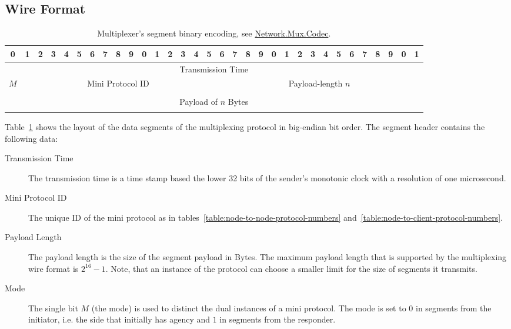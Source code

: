 \subsection{Wire Format}
\label{section:wire-format}

\begin{table}
  \begin{center}
    \begingroup
    \setlength{\tabcolsep}{3pt}
    \begin{tabular}{|c|c|c|c|c|c|c|c|c|c|c|c|c|c|c|c|c|c|c|c|c|c|c|c|c|c|c|c|c|c|c|c|}
      \hline
      0&1&2&3&4&5&6&7&8&9&0&1&2&3&4&5&6&7&8&9&0&1&2&3&4&5&6&7&8&9&0&1 \\ \hline
      \multicolumn{32}{|c|}{Transmission Time} \\ \hline
      \multicolumn{1}{|c|}{$M$}
      &\multicolumn{15}{|c|}{Mini Protocol ID}
      &\multicolumn{16}{|c|}{Payload-length $n$} \\ \hline
      \multicolumn{32}{|c|}{} \\
      \multicolumn{32}{|c|}{Payload of $n$ Bytes} \\
      \multicolumn{32}{|c|}{} \\ \hline
    \end{tabular}
    \endgroup
    \caption{Multiplexer's segment binary encoding, see
    \href{https://input-output-hk.github.io/ouroboros-network/network-mux/Network-Mux-Codec}{Network.Mux.Codec}.}
    \label{segment-header}
  \end{center}
\end{table}

Table~\ref{segment-header} shows the layout of the data segments of the multiplexing protocol
in big-endian bit order.  The segment header contains the following data:
\begin{description}
\item[Transmission Time]
  The transmission time is a time stamp based the lower 32 bits of the sender's monotonic clock with a
  resolution of one microsecond.
\item[Mini Protocol ID] The unique ID of the mini protocol as in
  tables~\ref{table:node-to-node-protocol-numbers}
    and~\ref{table:node-to-client-protocol-numbers}.
\item[Payload Length] The payload length is the size of the segment payload in Bytes.
  The maximum payload length that is supported by the multiplexing wire format is $2^{16}-1$.
  Note, that an instance of the protocol can choose a smaller limit for the size of segments it transmits.
\item[Mode] The single bit $M$ (the mode) is used to distinct the dual instances of a mini protocol.
  The mode is set to $0$ in segments from the initiator, i.e. the side that initially has agency and
  $1$ in segments from the responder.
\end{description}

